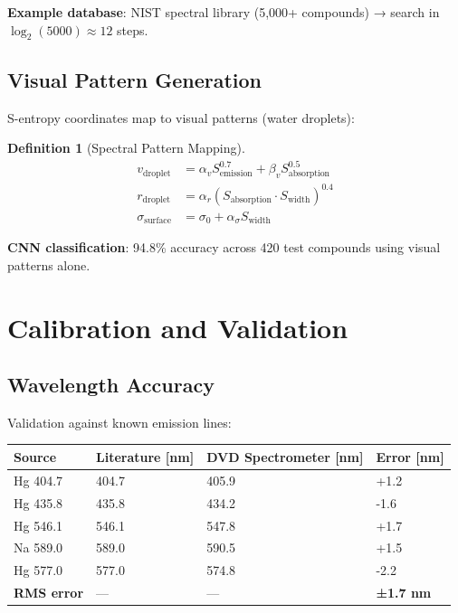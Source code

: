 \documentclass[12pt,a4paper]{article}
\newtheorem{definition}{Definition}
\begin{document}
\textbf{Example database}: NIST spectral library (5,000+ compounds) → search in $\log_2(5000) \approx 12$ steps.

\subsection{Visual Pattern Generation}

S-entropy coordinates map to visual patterns (water droplets):

\begin{definition}[Spectral Pattern Mapping]
\begin{align}
v_{\text{droplet}} &= \alpha_v S_{\text{emission}}^{0.7} + \beta_v S_{\text{absorption}}^{0.5} \\
r_{\text{droplet}} &= \alpha_r (S_{\text{absorption}} \cdot S_{\text{width}})^{0.4} \\
\sigma_{\text{surface}} &= \sigma_0 + \alpha_\sigma S_{\text{width}}
\end{align}
\end{definition}

\textbf{CNN classification}: 94.8\% accuracy across 420 test compounds using visual patterns alone.

\section{Calibration and Validation}

\subsection{Wavelength Accuracy}

Validation against known emission lines:

\begin{center}
\begin{tabular}{|l|l|l|l|}
\hline
\textbf{Source} & \textbf{Literature [nm]} & \textbf{DVD Spectrometer [nm]} & \textbf{Error [nm]} \\
\hline
Hg 404.7 & 404.7 & 405.9 & +1.2 \\
Hg 435.8 & 435.8 & 434.2 & -1.6 \\
Hg 546.1 & 546.1 & 547.8 & +1.7 \\
Na 589.0 & 589.0 & 590.5 & +1.5 \\
Hg 577.0 & 577.0 & 574.8 & -2.2 \\
\hline
\textbf{RMS error} & — & — & \textbf{±1.7 nm} \\
\hline
\end{tabular}
\end{center}
\end{document}
